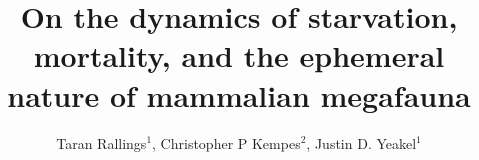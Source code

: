 \documentclass[]{rsos}%
\begin{document}
\title{On the dynamics of starvation, mortality, and the ephemeral nature of mammalian megafauna}

\author{%
Taran Rallings$^{1}$, Christopher P Kempes$^{2}$, Justin D. Yeakel$^{1}$} 

\address{
$^{1}$School of Natural Sciences, University of California Merced\\
$^{2}$Santa Fe Institute}

\subject{foodwebs, paleontology, ecology}

\end{document}
